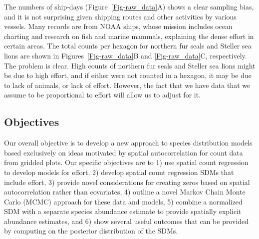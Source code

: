 \documentclass[11pt, titlepage]{article}
\begin{document}
\begin{spacing}{1.9}
\begin{flushleft}
The numbers of ship-days (Figure~\ref{Fig-raw_data}A) shows a clear sampling bias, and it is not surprising given shipping routes and other activities by various vessels.  Many records are from NOAA ships, whose mission includes ocean charting and research on fish and marine mammals, explaining the dense effort in certain areas.  The total counts per hexagon for northern fur seals and Steller sea lions are shown in Figures~\ref{Fig-raw_data}B and \ref{Fig-raw_data}C, respectively.  The problem is clear.  High counts of northern fur seals and Steller sea lions might be due to high effort, and if either were not counted in a hexagon, it may be due to lack of animals, or lack of effort.  However, the fact that we have data that we assume to be proportional to effort will allow us to adjust for it.


\subsection{Objectives} \label{sec:obj}

Our overall objective is to develop a new approach to species distribution models based exclusively on ideas motivated by spatial autocorrelation for count data from gridded plots.  Our specific objectives are to 1) use spatial count regression to develop models for effort, 2) develop spatial count regression SDMs that include effort, 3) provide novel considerations for creating zeros based on spatial autocorrelation rather than covariates, 4) outline a novel Markov Chain Monte Carlo (MCMC) approach for these data and models, 5) combine a normalized SDM with a separate species abundance estimate to provide spatially explicit abundance estimates, and 6) show several useful outcomes that can be provided by computing on the posterior distribution of the SDMs.



\end{flushleft}
\end{spacing}
\end{document}
